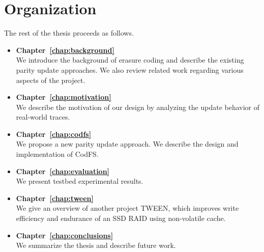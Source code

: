 
\section{Organization}

The rest of the thesis proceeds as follows. 

\begin{itemize}
    \item 
        \textbf{Chapter~\ref{chap:background}}\\
        We introduce the background of erasure coding and describe the existing
        parity update approaches. We also review related work regarding various 
        aspects of the project.
    \item
        \textbf{Chapter~\ref{chap:motivation}}\\
        We describe the motivation of our design by analyzing the update
        behavior of real-world traces. 
    \item 
        \textbf{Chapter~\ref{chap:codfs}}\\
        We propose a new parity update approach. We
        describe the design and implementation of CodFS. 
    \item 
        \textbf{Chapter~\ref{chap:evaluation}}\\ 
        We present testbed experimental results. 
    \item 
        \textbf{Chapter~\ref{chap:tween}}\\
        We give an overview of another project TWEEN, which improves write
        efficiency and endurance of an SSD RAID using non-volatile cache.
    \item 
        \textbf{Chapter~\ref{chap:conclusions}}\\
        We summarize the thesis and describe future work.
\end{itemize}

